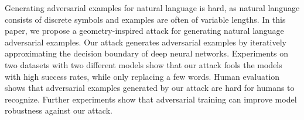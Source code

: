Generating adversarial examples for natural language is hard, as natural language consists of discrete symbols and examples are often of variable lengths. In this paper, we propose a geometry-inspired attack for generating natural language adversarial examples. Our attack generates adversarial examples by iteratively approximating the decision boundary of deep neural networks. Experiments on two datasets with two different models show that our attack fools the models with high success rates, while only replacing a few words. Human evaluation shows that adversarial examples generated by our attack are hard for humans to recognize. Further experiments show that adversarial training can improve model robustness against our attack.
